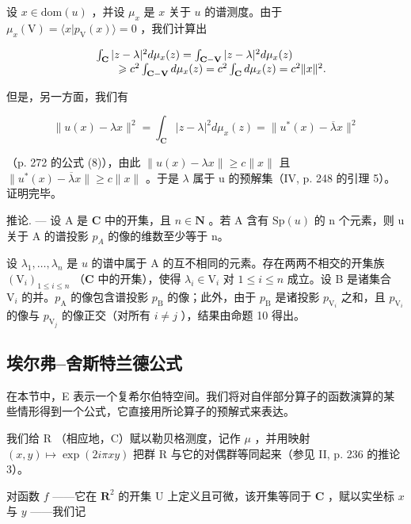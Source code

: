 设 \(x \in \mathrm{dom}(u)\) ，并设 \(\mu_x\) 是 \(x\) 关于 \(u\) 的谱测度。由于 \(\mu_x(\mathrm{V}) = \langle x | p_{\mathrm{V}}(x) \rangle = 0\) ，我们计算出

\[
\begin{array}{r l} & {\int_ {\mathbf {C}} | z - \lambda | ^ {2} d \mu_ {x} (z) = \int_ {\mathbf {C - V}} | z - \lambda | ^ {2} d \mu_ {x} (z)} \\ & {\qquad \geqslant c ^ {2} \int_ {\mathbf {C - V}} d \mu_ {x} (z) = c ^ {2} \int_ {\mathbf {C}} d \mu_ {x} (z) = c ^ {2} \| x \| ^ {2}.} \end{array}
\]

但是，另一方面，我们有

\[
\| u (x) - \lambda x \| ^ {2} = \int_ {\mathbf {C}} | z - \lambda | ^ {2} d \mu_ {x} (z) = \| u ^ {*} (x) - \overline {{\lambda}} x \| ^ {2}
\]

（p. 272 的公式 (8)），由此 \(\|u(x)-\lambda x\|\geqslant c\|x\|\) 且 \(\|u^{*}(x)-\overline{\lambda}x\|\geqslant c\|x\|\) 。于是 \(\lambda\) 属于 u 的预解集（IV, p. 248 的引理 5）。证明完毕。

推论. — 设 A 是 \(\mathbf{C}\) 中的开集，且 \(n \in \mathbf N\) 。若 A 含有 \(\mathrm{Sp}(u)\) 的 n 个元素，则 u 关于 A 的谱投影 \(p_{A}\) 的像的维数至少等于 n。

设 \(\lambda_1, \ldots, \lambda_n\) 是 \(u\) 的谱中属于 A 的互不相同的元素。存在两两不相交的开集族 \((\mathrm{V}_i)_{1 \leqslant i \leqslant n}\) （\(\mathbf{C}\) 中的开集），使得 \(\lambda_i \in \mathrm{V}_i\) 对 \(1 \leqslant i \leqslant n\) 成立。设 B 是诸集合 \(\mathrm{V}_i\) 的并。\(p_{\mathrm{A}}\) 的像包含谱投影 \(p_{\mathrm{B}}\) 的像；此外，由于 \(p_{\mathrm{B}}\) 是诸投影 \(p_{\mathrm{V}_i}\) 之和，且 \(p_{\mathrm{V}_i}\) 的像与 \(p_{\mathrm{V}_j}\) 的像正交（对所有 \(i \neq j\) ），结果由命题 10 得出。

\subsection{埃尔弗--舍斯特兰德公式}

在本节中，E 表示一个复希尔伯特空间。我们将对自伴部分算子的函数演算的某些情形得到一个公式，它直接用所论算子的预解式来表达。

我们给 R （相应地，C）赋以勒贝格测度，记作 \(\mu\) ，并用映射 \((x,y)\mapsto\exp(2i\pi xy)\) 把群 R 与它的对偶群等同起来（参见 II, p. 236 的推论 3）。

对函数 \(f\) ——它在 \(\mathbf{R}^{2}\) 的开集 U 上定义且可微，该开集等同于 \(\mathbf{C}\) ，赋以实坐标 \(x\) 与 \(y\) ——我们记

